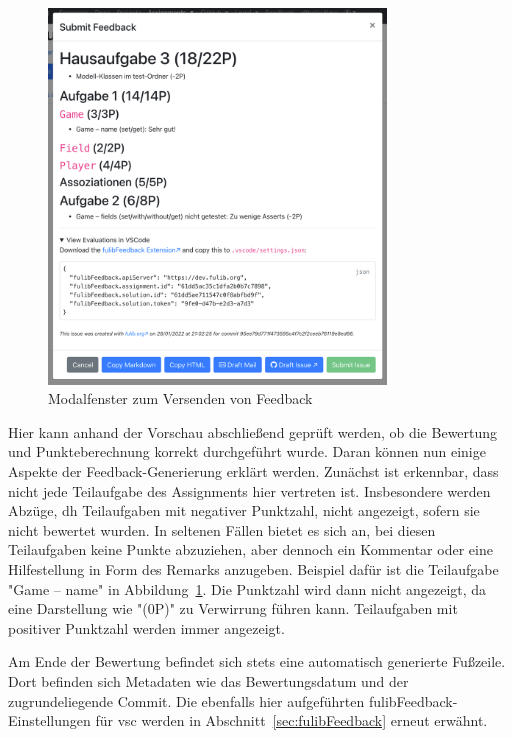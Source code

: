 \begin{figure}
    \centering
    \includegraphics[width=0.8\textwidth]{images/submit-feedback}
    \caption{Modalfenster zum Versenden von Feedback}
    \label{fig:submit-feedback}
\end{figure}

Hier kann anhand der Vorschau abschließend geprüft werden, ob die Bewertung und Punkteberechnung korrekt durchgeführt wurde.
Daran können nun einige Aspekte der Feedback-Generierung erklärt werden.
Zunächst ist erkennbar, dass nicht jede Teilaufgabe des Assignments hier vertreten ist.
Insbesondere werden Abzüge, \ac{dh} Teilaufgaben mit negativer Punktzahl, nicht angezeigt, sofern sie nicht bewertet wurden.
In seltenen Fällen bietet es sich an, bei diesen Teilaufgaben keine Punkte abzuziehen, aber dennoch ein Kommentar oder eine Hilfestellung in Form des Remarks anzugeben.
Beispiel dafür ist die Teilaufgabe "Game -- name" in Abbildung~\ref{fig:submit-feedback}.
Die Punktzahl wird dann nicht angezeigt, da eine Darstellung wie "(0P)" zu Verwirrung führen kann.
Teilaufgaben mit positiver Punktzahl werden immer angezeigt.

Am Ende der Bewertung befindet sich stets eine automatisch generierte Fußzeile.
Dort befinden sich Metadaten wie das Bewertungsdatum und der zugrundeliegende Commit.
Die ebenfalls hier aufgeführten fulibFeedback-Einstellungen für \ac{vsc} werden in Abschnitt~\ref{sec:fulibFeedback} erneut erwähnt.


